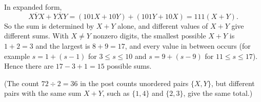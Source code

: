 In expanded form,
\[
\overline{XYX}+\overline{YXY}=(101X+10Y)+(101Y+10X)=111(X+Y).
\]
So the sum is determined by $X+Y$ alone, and different values of $X+Y$ give different sums. With $X\ne Y$ nonzero digits, the smallest possible $X+Y$ is $1+2=3$ and the largest is $8+9=17$, and every value in between occurs (for example $s=1+(s-1)$ for $3\le s\le10$ and $s=9+(s-9)$ for $11\le s\le17$). Hence there are $17-3+1=\boxed{15}$ possible sums.

(The count $72\div2=36$ in the post counts unordered pairs $\{X,Y\}$, but different pairs with the same sum $X+Y$, such as $\{1,4\}$ and $\{2,3\}$, give the same total.)
